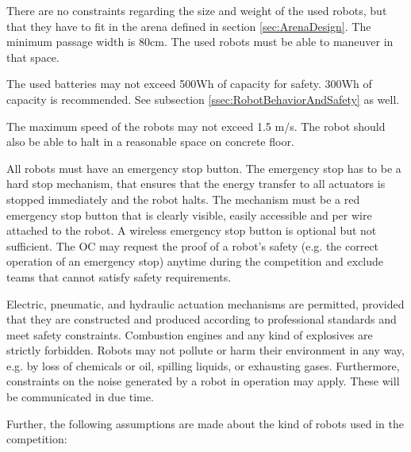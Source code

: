 There are no constraints regarding the size and weight of the used robots, but that they have to fit in the arena defined in section \ref{sec:ArenaDesign}. The minimum passage width is $80\si{\centi\meter}$. The used robots must be able to maneuver in that space.\par

The used batteries may not exceed 500Wh of capacity for safety. 300Wh of capacity is recommended. See subsection \ref{ssec:RobotBehaviorAndSafety} as well.\par 

The maximum speed of the robots may not exceed 1.5 m/s. The robot should also be able to halt in a reasonable space on concrete floor.\par 
\par
All robots must have an emergency stop button. The emergency stop has to be a hard stop mechanism, that ensures that the energy transfer to all actuators is stopped immediately and the robot halts. The mechanism must be a red emergency stop button that is clearly visible, easily accessible and per wire attached to the robot. A wireless emergency stop button is optional but not sufficient.
The OC may request the proof of a robot's safety (e.g. the correct operation of an emergency stop) anytime during the competition and exclude teams that cannot satisfy safety requirements.
\par
Electric, pneumatic, and hydraulic actuation mechanisms are permitted, provided that they are constructed and produced according to professional standards and meet safety constraints. Combustion engines and any kind of explosives are strictly forbidden. Robots may not pollute or harm their environment in any way, e.g. by loss of chemicals or oil, spilling liquids, or exhausting gases. Furthermore, constraints on the noise generated by a robot in operation may apply. These will be communicated in due time.
\par
Further, the following assumptions are made about the kind of robots used in the competition:
\par

